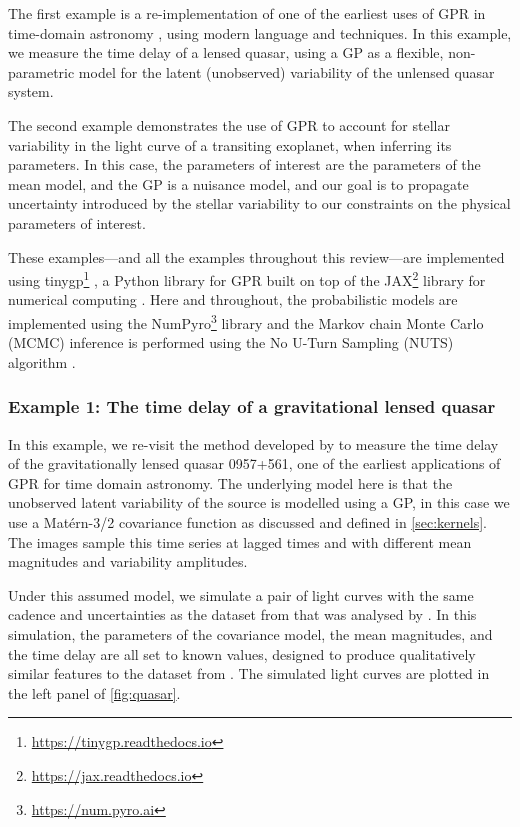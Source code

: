 \documentclass[letterpaper]{ar-1col}
\newcommand{\project}[1]{\textsf{#1}}
\begin{document}
The first example is a re-implementation of one of the earliest uses of GPR in time-domain astronomy \citep{prh92a}, using modern language and techniques.
In this example, we measure the time delay of a lensed quasar, using a GP as a flexible, non-parametric model for the latent (unobserved) variability of the unlensed quasar system.

The second example demonstrates the use of GPR to account for stellar variability in the light curve of a transiting exoplanet, when inferring its parameters.
In this case, the parameters of interest are the parameters of the mean model, and the GP is a nuisance model, and our goal is to propagate uncertainty introduced by the stellar variability to our constraints on the physical parameters of interest.

These examples---and all the examples throughout this review---are implemented using \textsf{tinygp}\footnote{\url{https://tinygp.readthedocs.io}} \citep{tinygp}, a \project{Python} library for GPR built on top of the \project{JAX}\footnote{\url{https://jax.readthedocs.io}} library for numerical computing \citep{jax}.
Here and throughout, the probabilistic models are implemented using the \project{NumPyro}\footnote{\url{https://num.pyro.ai}} library \citep{numpyro} and the Markov chain Monte Carlo (MCMC) inference is performed using the No U-Turn Sampling (NUTS) algorithm \citep{Hoffman:2014}.

\subsubsection{Example 1: The time delay of a gravitational lensed quasar}
\label{sec:quasar}

In this example, we re-visit the method developed by \citet{prh92a} to measure the time delay of the gravitationally lensed quasar 0957+561, one of the earliest applications of GPR for time domain astronomy. 
The underlying model here is that the unobserved latent variability of the source is modelled using a GP, in this case we use a Mat\'ern-3/2 covariance function as discussed and defined in \autoref{sec:kernels}.
The images sample this time series at lagged times and with different mean magnitudes and variability amplitudes. 

Under this assumed model, we simulate a pair of light curves with the same cadence and uncertainties as the dataset from \citet{1989A&A...215....1V} that was analysed by \citet{prh92a}. 
In this simulation, the parameters of the covariance model, the mean magnitudes, and the time delay are all set to known values, designed to produce qualitatively similar features to the dataset from \citet{1989A&A...215....1V}.
The simulated light curves are plotted in the left panel of \autoref{fig:quasar}.
\end{document}
